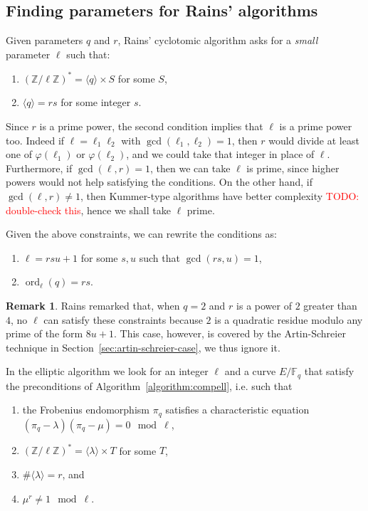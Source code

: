 \documentclass[12pt]{article}
\theoremstyle{plain}
\theoremstyle{definition}
\newtheorem*{remark}{Remark}
\newcommand{\todo}[1]{\textcolor{red}{TODO: #1}}
\DeclareMathOperator{\order}{ord} %
\def\Z{\ensuremath{\mathbb{Z}}}
\def\F{\ensuremath{\mathbb{F}}}
\def\euler{\ensuremath{\varphi}}
\newcounter{algorithm}
\begin{document}
\subsection{Finding parameters for Rains' algorithms}

Given parameters $q$ and $r$, Rains' cyclotomic algorithm asks for a
\emph{small} parameter $\ell$ such that:
\begin{enumerate}
\item $(\Z/\ell\Z)^\ast = \langle q\rangle \times S$ for some $S$,
\item $\langle q \rangle = rs$ for some integer $s$.
\end{enumerate}

Since $r$ is a prime power, the second condition implies that $\ell$
is a prime power too. Indeed if $\ell=\ell_1\ell_2$ with
$\gcd(\ell_1,\ell_2)=1$, then $r$ would divide at least one of
$\euler(\ell_1)$ or $\euler(\ell_2)$, and we could take that integer
in place of $\ell$. Furthermore, if $\gcd(\ell,r)=1$, then we can take
$\ell$ is prime, since higher powers would not help satisfying the
conditions. On the other hand, if $\gcd(\ell,r)\ne1$, then Kummer-type
algorithms have better complexity \todo{double-check this}, hence we
shall take $\ell$ prime.

Given the above constraints, we can rewrite the conditions as:
\begin{enumerate}
\item $\ell = rsu + 1$ for some $s,u$ such that $\gcd(rs,u)=1$,
\item $\order_\ell(q) = rs$.
\end{enumerate}

\begin{remark}
  Rains remarked that, when $q=2$ and $r$ is a power of $2$ greater
  than $4$, no $\ell$ can satisfy these constraints because $2$ is a
  quadratic residue modulo any prime of the form $8u+1$. This case,
  however, is covered by the Artin-Schreier technique in
  Section~\ref{sec:artin-schreier-case}, we thus ignore it.
\end{remark}

In the elliptic algorithm we look for an integer $\ell$ and a curve
$E/\F_q$ that satisfy the preconditions of
Algorithm~\ref{algorithm:compell}, i.e. such that 
\begin{enumerate}
\item the Frobenius endomorphism $\pi_q$ satisfies a characteristic
  equation $(\pi_q-\lambda)(\pi_q-\mu) = 0 \mod \ell$,
\item $(\Z/\ell\Z)^\ast = \langle\lambda\rangle\times T$ for some $T$,
\item $\#\langle\lambda\rangle=r$, and
\item $\mu^r\ne1\mod\ell$.
\end{enumerate}
\end{document}
